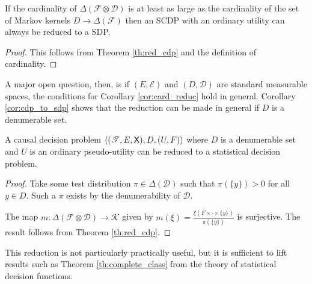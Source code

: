 \begin{corollary}\label{cor:card_reduc}
If the cardinality of $\Delta(\mathcal{F}\otimes\mathcal{D})$ is at least as large as the cardinality of the set of Markov kernels $D\to \Delta(\mathcal{F})$ then an SCDP with an ordinary utility can always be reduced to a SDP.
\end{corollary}

\begin{proof}
This follows from Theorem \ref{th:red_cdp} and the definition of cardinality.
\end{proof}

A major open question, then, is if $(E,\mathcal{E})$ and $(D,\mathcal{D})$ are standard measurable spaces, the conditions for Corollary \ref{cor:card_reduc} hold in general. Corollary \ref{cor:cdp_to_sdp} shows that the reduction can be made in general if $D$ is a denumerable set.

\begin{corollary}\label{cor:cdp_to_sdp}
A causal decision problem $\langle (\mathscr{T},E,\mathsf{X}),D,(U,F)\rangle$ where $D$ is a denumerable set and  $U$ is an ordinary pseudo-utility can be reduced to a statistical decision problem.
\end{corollary}

\begin{proof}
Take some test distribution $\pi\in \Delta(\mathcal{D})$ such that $\pi(\{y\})>0$ for all $y\in D$. Such a $\pi$ exists by the denumerability of $\mathcal{D}$.

The map $m:\Delta(\mathcal{F}\otimes\mathcal{D})\to \mathscr{K}$ given by $m(\xi) = \frac{\xi(F\times \cdot\times \{y\})}{\pi(\{y\})}$ is surjective. The result follows from Theorem \ref{th:red_cdp}.
\end{proof}

This reduction is not particularly practically useful, but it is sufficient to lift results such as Theorem \ref{th:complete_class} from the theory of statistical decision functions.
